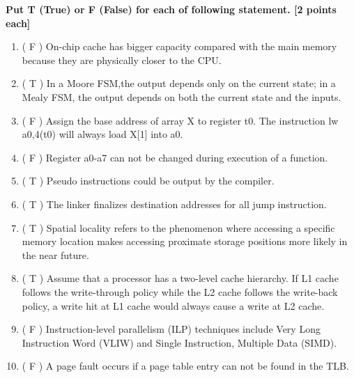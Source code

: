 \documentclass[addpoints, 12pt, answers]{exam}
\begin{document}
\begin{questions}

    \question[20] \textbf{Put T (True) or F (False) for each of following statement. [2 points each]}

    \begin{enumerate}[(1)]
        \item ( F ) On-chip cache has bigger capacity compared with the main memory because they are physically closer to the CPU.

        \item ( T ) In a Moore FSM,the output depends only on the current state; in a Mealy FSM, the output depends on both the current state and the inputs.

        \item ( F ) Assign the base address of array X to register t0. The instruction lw a0,4(t0) will always load X[1] into a0.

        \item ( F ) Register a0-a7 can not be changed during execution of a function.

        \item ( T ) Pseudo instructions could be output by the compiler.

        \item ( T ) The linker finalizes destination addresses for all jump instruction.

        \item ( T ) Spatial locality refers to the phenomenon where accessing a specific memory location makes accessing proximate storage positions more likely in the near future.

        \item ( T ) Assume that a processor has a two-level cache hierarchy. If L1 cache follows the write-through policy while the L2 cache follows the write-back policy, a write hit at L1 cache would always cause a write at L2 cache.

        \item ( F ) Instruction-level parallelism (ILP) techniques include Very Long Instruction Word (VLIW) and Single Instruction, Multiple Data (SIMD).

        \item ( F ) A page fault occurs if a page table entry can not be found in the TLB.

    \end{enumerate}

    \pagebreak


\end{questions}
\end{document}
